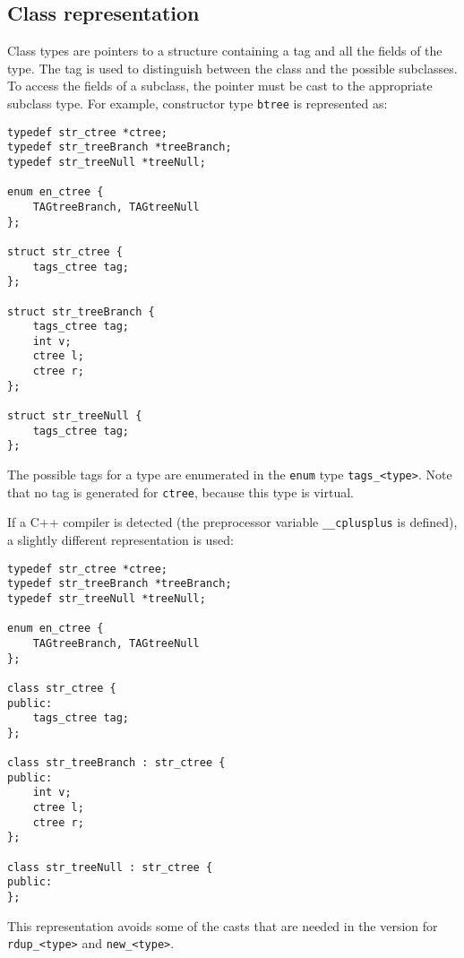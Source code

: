 \subsection{Class representation}
Class types are pointers to a structure containing
a tag and all the fields of the type.
The tag is used to distinguish between the class and the possible
subclasses. To access the fields of a subclass, the pointer must
be cast to the appropriate subclass type.
For example, constructor type {\tt btree} is represented as:
\begin{showfile}
\begin{verbatim}
typedef str_ctree *ctree;
typedef str_treeBranch *treeBranch;
typedef str_treeNull *treeNull;

enum en_ctree {
    TAGtreeBranch, TAGtreeNull
};

struct str_ctree {
    tags_ctree tag;
};

struct str_treeBranch {
    tags_ctree tag;
    int v;
    ctree l;
    ctree r;
};

struct str_treeNull {
    tags_ctree tag;
};
\end{verbatim}
\end{showfile}
The possible tags for a type are enumerated in the {\tt enum} type
{\tt tags\_<type>}. Note that no tag is generated for {\tt ctree},
because this type is virtual.
\par
If a C++ compiler is detected (the preprocessor variable \verb'__cplusplus' 
is defined), a slightly different representation is used:
\begin{showfile}
\begin{verbatim}
typedef str_ctree *ctree;
typedef str_treeBranch *treeBranch;
typedef str_treeNull *treeNull;

enum en_ctree {
    TAGtreeBranch, TAGtreeNull
};

class str_ctree {
public:
    tags_ctree tag;
};

class str_treeBranch : str_ctree {
public:
    int v;
    ctree l;
    ctree r;
};

class str_treeNull : str_ctree {
public:
};
\end{verbatim}
\end{showfile}
This representation avoids some of the casts that are needed in the {\C}
version for \verb'rdup_<type>' and \verb'new_<type>'.

